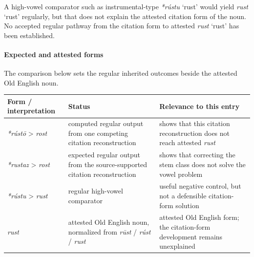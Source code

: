 \documentclass[
  british,
  a4paper,
]{article}
\newcounter{none} %
\providecommand{\Recon}[1]{\emph{*#1}}
\begin{document}
A high-vowel comparator such as instrumental-type \Recon{rústu} `rust'
would yield {\emph{rust}} `rust' regularly, but that does not explain
the attested citation form of the noun. No accepted regular pathway from
the citation form to attested {\emph{rust}} `rust' has been established.

\paragraph{Expected and attested
forms}\label{expected-and-attested-forms-1}

The comparison below sets the regular inherited outcomes beside the
attested Old English noun.

{\def\LTcaptype{none} %
\begin{longtable}[]{@{}
  >{\raggedright\arraybackslash}p{}
  >{\raggedright\arraybackslash}p{}
  >{\raggedright\arraybackslash}p{}@{}}
\toprule\noalign{}
\begin{minipage}[b]{\linewidth}\raggedright
Form / interpretation
\end{minipage} & \begin{minipage}[b]{\linewidth}\raggedright
Status
\end{minipage} & \begin{minipage}[b]{\linewidth}\raggedright
Relevance to this entry
\end{minipage} \\
\midrule\noalign{}
\endhead
\bottomrule\noalign{}
\endlastfoot
\emph{*rústō} \textgreater{} \emph{rost} & computed regular output from
one competing citation reconstruction & shows that this citation
reconstruction does not reach attested \emph{rust} \\
\emph{*rustaz} \textgreater{} \emph{rost} & expected regular output from
the source-supported citation reconstruction & shows that correcting the
stem class does not solve the vowel problem \\
\emph{*rústu} \textgreater{} \emph{rust} & regular high-vowel comparator
& useful negative control, but not a defensible citation-form
solution \\
\emph{rust} & attested Old English noun, normalized from \emph{rūst} /
\emph{rúst} / \emph{rust} & attested Old English form; the citation-form
development remains unexplained \\
\end{longtable}
}
\end{document}
